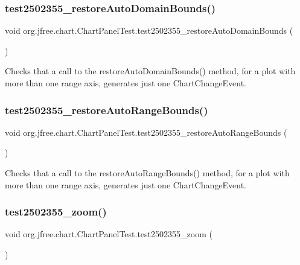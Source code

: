 \subsubsection{\texorpdfstring{test2502355\+\_\+restore\+Auto\+Domain\+Bounds()}{test2502355\_restoreAutoDomainBounds()}}
{\footnotesize\ttfamily void org.\+jfree.\+chart.\+Chart\+Panel\+Test.\+test2502355\+\_\+restore\+Auto\+Domain\+Bounds (\begin{DoxyParamCaption}{ }\end{DoxyParamCaption})}

Checks that a call to the restore\+Auto\+Domain\+Bounds() method, for a plot with more than one range axis, generates just one Chart\+Change\+Event. \mbox{\label{classorg_1_1jfree_1_1chart_1_1_chart_panel_test_afe5f2cff5830fd8b481fe7543fd0f072}} 
\subsubsection{\texorpdfstring{test2502355\+\_\+restore\+Auto\+Range\+Bounds()}{test2502355\_restoreAutoRangeBounds()}}
{\footnotesize\ttfamily void org.\+jfree.\+chart.\+Chart\+Panel\+Test.\+test2502355\+\_\+restore\+Auto\+Range\+Bounds (\begin{DoxyParamCaption}{ }\end{DoxyParamCaption})}

Checks that a call to the restore\+Auto\+Range\+Bounds() method, for a plot with more than one range axis, generates just one Chart\+Change\+Event. \mbox{\label{classorg_1_1jfree_1_1chart_1_1_chart_panel_test_a26156f029f2f350b7df7e12e8a63d271}} 
\subsubsection{\texorpdfstring{test2502355\+\_\+zoom()}{test2502355\_zoom()}}
{\footnotesize\ttfamily void org.\+jfree.\+chart.\+Chart\+Panel\+Test.\+test2502355\+\_\+zoom (\begin{DoxyParamCaption}{ }\end{DoxyParamCaption})}

